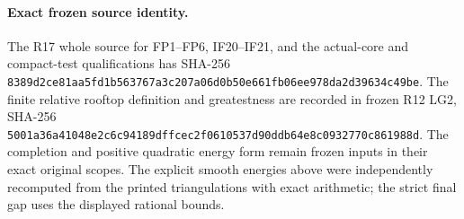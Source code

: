 \documentclass{article}
\begin{document}
\paragraph{Exact frozen source identity.}
The R17 whole source for FP1--FP6, IF20--IF21, and the actual-core and
compact-test qualifications has SHA-256
\texttt{8389d2ce81aa5fd1b563767a3c207a06d0b50e661fb06ee978da2d39634c49be}.
The finite relative rooftop definition and greatestness are recorded
in frozen R12 LG2, SHA-256
\texttt{5001a36a41048e2c6c94189dffcec2f0610537d90ddb64e8c0932770c861988d}.
The completion and positive quadratic energy form remain frozen inputs
in their exact original scopes. The explicit smooth energies above were
independently recomputed from the printed triangulations with exact
arithmetic; the strict final gap uses the displayed rational bounds.
\end{document}
